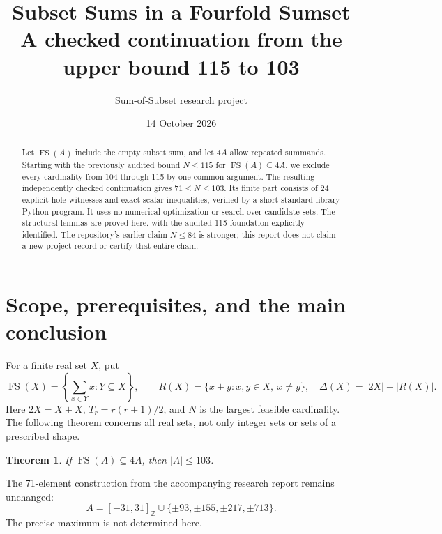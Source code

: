 \documentclass[11pt,a4paper]{article}
\title{Subset Sums in a Fourfold Sumset\\
\large A checked continuation from the upper bound 115 to 103}
\author{Sum-of-Subset research project}
\date{14 October 2026}
\newcommand{\FS}{\operatorname{FS}}
\newcommand{\Z}{\mathbb Z}
\newtheorem{theorem}{Theorem}[section]
\begin{document}
\maketitle
\begin{abstract}
Let $\FS(A)$ include the empty subset sum, and let $4A$ allow repeated
summands. Starting with the previously audited bound $N\le115$ for
$\FS(A)\subseteq4A$, we exclude every cardinality from 104 through 115
by one common argument. The resulting independently checked continuation
gives $71\le N\le103$. Its finite part consists of 24 explicit hole
witnesses and exact scalar inequalities, verified by a short standard-library
Python program. It uses no numerical optimization or search over candidate
sets. The structural lemmas are proved here, with the audited 115 foundation
explicitly identified. The repository's earlier claim $N\le84$ is stronger;
this report does not claim a new project record or certify that entire chain.
\end{abstract}
\tableofcontents

\section{Scope, prerequisites, and the main conclusion}
For a finite real set $X$, put
\[
 \FS(X)=\left\{\sum_{x\in Y}x:Y\subseteq X\right\},\qquad
 R(X)=\{x+y:x,y\in X,\ x\ne y\},\quad
 \Delta(X)=|2X|-|R(X)|.
\]
Here $2X=X+X$, $T_r=r(r+1)/2$, and $N$ is the largest feasible
cardinality. The following theorem concerns all real sets, not only integer
sets or sets of a prescribed shape.
\begin{theorem}\label{thm:main}
If $\FS(A)\subseteq4A$, then $|A|\le103$.
\end{theorem}
The 71-element construction from the accompanying research report remains
unchanged:
\[
 A=[-31,31]_{\Z}\cup\{\pm93,\pm155,\pm217,\pm713\}.
\]
The precise maximum is not determined here.
\end{document}
